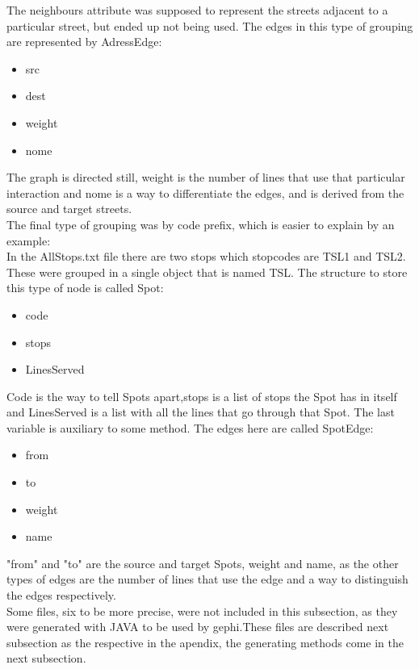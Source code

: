 \documentclass[12pt]{article}
\begin{document}
\begin{multicols}{2}
The neighbours attribute was supposed to represent the streets adjacent to a particular street, but ended up not being used. The edges in this type of grouping are represented by AdressEdge:
	
\begin{itemize}
	\item src
	\item dest
	\item weight
	\item nome
\end{itemize}
	
The graph is directed still, weight is the number of lines that use that particular interaction and nome is a way to differentiate the edges, and is derived from the source and target streets.\\

The final type of grouping was by code prefix, which is easier to explain by an example:\\
In the AllStops.txt file there are two stops which stopcodes are TSL1 and TSL2. These were grouped in a single object that is named TSL. The structure to store this type of node is called Spot:

\begin{itemize}
	\item code
	\item stops
	\item LinesServed
\end{itemize}
	
Code is the way to tell Spots apart,stops is a list of stops the Spot has in itself and LinesServed is a list with all the lines that go through that Spot. The last variable is auxiliary to some method. The edges here are called SpotEdge:\\

\begin{itemize}
    \item from
    \item to
    \item weight
    \item name
\end{itemize}

"from" and "to" are the source and target Spots, weight and name, as the other types of edges are the number of lines that use the edge and a way to distinguish the edges respectively.\\
Some files, six to be more precise, were not included in this subsection, as they were generated with JAVA to be used by gephi.These files are described next subsection as the respective in the apendix, the generating methods come in the next subsection.


\end{multicols}
\end{document}
